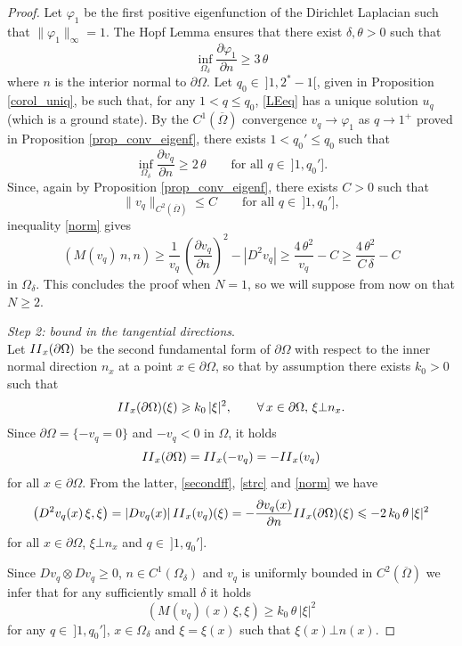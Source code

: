 \documentclass[12pt]{amsart}
\numberwithin{equation}{section}
\theoremstyle{plain}
\theoremstyle{plain}
\theoremstyle{plain}
\theoremstyle{definition}
\newcommand{\beq}{\begin{equation}}
\newcommand{\eeq}{\end{equation}}
\renewcommand{\le}{\leqslant}
\renewcommand{\ge}{\geqslant}
\begin{document}
\begin{proof}
Let $\varphi_1$ be the first positive eigenfunction of the Dirichlet Laplacian such that $\|\varphi_1\|_\infty=1$. 
 The Hopf Lemma ensures that there exist $\delta, \theta>0$ such that 
 \[
 \inf_{\Omega_{\delta}}\frac{\partial \varphi_1}{\partial n}\ge 3\, \theta
 \]
 where $n$ is the interior normal to $\partial\Omega$.
Let $q_0\in \ ]1, 2^*-1[$, given in Proposition \ref{corol_uniq}, be such that, for any $1<q\le q_0$, \eqref{LEeq} has a unique solution $u_q$ (which is a ground state).
 By the $C^1(\overline{\Omega})$ convergence $v_q\to \varphi_1$ as $q\to 1^+$ proved in Proposition \ref{prop_conv_eigenf}, there exists $1<q_0'\le q_0 $ such that 
 \beq
 \label{norm}
 \inf_{\Omega_\delta}\frac{\partial v_q}{\partial n}\ge 2\, \theta \qquad \text{for all $q\in \ ]1, q_0']$}.
 \eeq
 Since, again by Proposition \ref{prop_conv_eigenf}, there exists $C>0$ such that
 \begin{equation}\label{eq_unif_c2_est}
 \|v_q\|_{C^2(\overline{\Omega})} \leq C \qquad \text{for all $q\in \ ]1, q_0']$},
 \end{equation}
inequality \eqref{norm} gives
 \beq
 \label{norm2}
 \left(M(v_q)\, n, n\right)\ge \frac{1}{v_q}\, \left(\frac{\partial v_q}{\partial n}\right)^2-|D^2 v_q|\ge \frac{4\, \theta^2}{v_q} -C\ge \frac{4\, \theta^2}{C\, \delta}- C
 \eeq
in $\Omega_\delta$. 
This concludes the proof when $N=1$, so we will suppose from now on that $N\ge 2$.

\smallskip
 {\em Step 2: bound in the tangential directions}.\ \\
 Let ${\rm II}_{x}(\partial\Omega)$ be the second fundamental form of $\partial\Omega$ with respect to the inner normal direction $ n_x$ at a point $x\in \partial\Omega$, so that by assumption there exists $k_0>0$ such that 
\beq
\label{strc}
{\rm II}_{x}(\partial\Omega)(\xi)\ge k_0\, |\xi|^2, \qquad \forall \, x\in \partial\Omega, \, \xi\bot n_x.
\eeq
Since $\partial\Omega=\{-v_q=0\}$ and $-v_q<0$ in $\Omega$, it holds
\[
{\rm II}_{x}(\partial\Omega)={\rm II}_{x}(-v_q)=-{\rm II}_{x}(v_q)
\]
for all $x\in \partial\Omega$.
From the latter, \eqref{secondff}, \eqref{strc} and \eqref{norm} we have
\[
\left(D^2v_q(x)\, \xi, \xi\right)=|Dv_q(x)|\, {\rm II}_x(v_q)(\xi)=- \frac{\partial v_q(x)}{\partial n}{\rm II}_{x}(\partial\Omega)(\xi) \le -2\, k_0\, \theta\, |\xi|^2
\]
for all $x\in \partial\Omega$, $\xi\bot n_x$ and $q\in \ ]1, q_0']$.

 Since $Dv_q\otimes Dv_q\ge 0$, $n\in C^1(\Omega_\delta)$ and $v_q$ is uniformly bounded in $C^2(\overline{\Omega})$ we infer that for any sufficiently small $\delta$ it holds
 \beq
 \label{tang}
 \left(M(v_q)(x)\, \xi, \xi\right)\ge k_0\, \theta\, |\xi|^2
 \eeq
 for any $q\in \ ]1, q_0']$, $x\in \Omega_\delta$ and $\xi=\xi(x)$ such that $\xi(x)\bot n(x)$. 
 

\end{proof}
\end{document}
